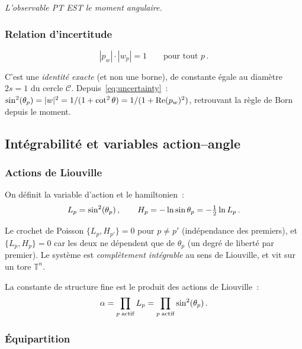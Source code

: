 \documentclass[12pt,a4paper]{article}
\begin{document}
\emph{L'observable PT EST le moment angulaire.}

\subsubsection{Relation d'incertitude}
\label{subsec:cx_uncertainty}

\begin{equation}
  |p_w| \cdot |w_p| = 1 \qquad\text{pour tout } p\,.
  \label{eq:uncertainty}
\end{equation}

C'est une \emph{identité exacte} (et non une borne), de constante
égale au diamètre $2s = 1$ du cercle $\mathcal{C}$.
Depuis~\eqref{eq:uncertainty}~:
$\sin^2(\theta_{p}) = |w|^2 = 1/(1 + \cot^2\theta)
= 1/(1 + \mathrm{Re}(p_w)^2)$,
retrouvant la règle de Born depuis le moment.


\subsection{Intégrabilité et variables action--angle}
\label{sec:cx_integrability}

\subsubsection{Actions de Liouville}

On définit la variable d'action et le hamiltonien~:
\begin{equation}
  L_p = \sin^2(\theta_{p})\,,\qquad
  H_p = -\ln\sin\theta_p = -\tfrac{1}{2}\ln L_p\,.
  \label{eq:liouville}
\end{equation}

Le crochet de Poisson $\{L_p, H_{p'}\} = 0$ pour $p \neq p'$
(indépendance des premiers), et $\{L_p, H_p\} = 0$ car les deux ne
dépendent que de $\theta_p$ (un degré de liberté par premier). Le
système est \emph{complètement intégrable} au sens de Liouville, et
vit sur un tore $\mathbb{T}^n$.

La constante de structure fine est le produit des actions de
Liouville~:
\begin{equation}
  \alpha = \prod_{p\;\mathrm{actif}} L_p
  = \prod_{p\;\mathrm{actif}} \sin^2(\theta_{p})\,.
  \label{eq:alpha_liouville}
\end{equation}

\subsubsection{Équipartition}
\label{subsec:cx_equipartition}
\end{document}
